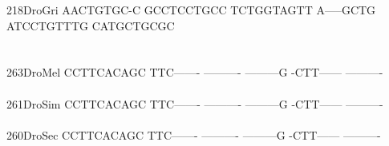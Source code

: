 \documentclass[11pt,twoside,reqno,a4paper]{article}
\begin{document}
{218\hspace*{1\charwidth}DroGri	AACTGTGC-C	GCCTCCTGCC	TCTGGTAGTT	A-----GCTG	ATCCTGTTTG	CATGCTGCGC	\\
\hspace*{4\charwidth}\hspace*{7\charwidth}\hspace*{1\charwidth}\hspace*{1\charwidth}\hspace*{1\charwidth}\hspace*{1\charwidth}\hspace*{1\charwidth}\hspace*{1\charwidth}\\
\\
263\hspace*{1\charwidth}DroMel	CCTTCACAGC	TTC-------	----------	---------G	-CTT------	----------	\\
\hspace*{4\charwidth}\hspace*{7\charwidth}\hspace*{1\charwidth}\hspace*{1\charwidth}\hspace*{1\charwidth}\hspace*{1\charwidth}\hspace*{1\charwidth}\hspace*{1\charwidth}\\
261\hspace*{1\charwidth}DroSim	CCTTCACAGC	TTC-------	----------	---------G	-CTT------	----------	\\
\hspace*{4\charwidth}\hspace*{7\charwidth}\hspace*{1\charwidth}\hspace*{1\charwidth}\hspace*{1\charwidth}\hspace*{1\charwidth}\hspace*{1\charwidth}\hspace*{1\charwidth}\\
260\hspace*{1\charwidth}DroSec	CCTTCACAGC	TTC-------	----------	---------G	-CTT------	----------	\\
\hspace*{4\charwidth}\hspace*{7\charwidth}\hspace*{1\charwidth}\hspace*{1\charwidth}\hspace*{1\charwidth}\hspace*{1\charwidth}\hspace*{1\charwidth}\hspace*{1\charwidth}\\
}
\end{document}
